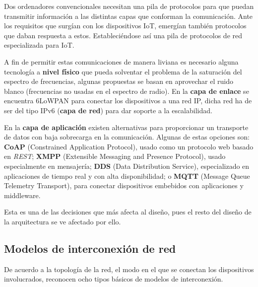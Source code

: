 \documentclass[a4paper,10pt]{article}
\begin{document}
Dos ordenadores convencionales necesitan una pila de protocolos para que
puedan transmitir información a las distintas capas que conforman la
comunicación. Ante los requisitos que surgían con los dispositivos IoT,
emergían también protocolos que daban respuesta a estos. Estableciéndose
así una pila de protocolos de red especializada para IoT.

A fin de permitir estas comunicaciones de manera liviana es necesario
alguna tecnología a \textbf{nivel físico} que pueda solventar el
problema de la saturación del espectro de frecuencias, algunas
propuestas se basan en aprovechar el ruido blanco (frecuencias no
usadas en el espectro de radio)\cite{tempertonTVWhiteSpace2015}.  En
la \textbf{capa de enlace} se encuentra 6LoWPAN
\cite{schumacherIPv6LowPowerWireless} para conectar los dispositivos a
una red IP, dicha red ha de ser del tipo IPv6 (\textbf{capa de red})
para dar soporte a la escalabilidad.

En la \textbf{capa de aplicación} existen alternativas para
proporcionar un transporte de datos con baja sobrecarga en la
comunicación. Algunas de estas opciones\cite{al-fuqahaInternetThingsSurvey2015}
son: \textbf{CoAP}
(Constrained Application Protocol), usado como un protocolo web basado
en \textit{REST}\cite{WebServicesArchitecture}; \textbf{XMPP}
(Extensible Messaging and Presence Protocol), usado especialmente en
mensajería; \textbf{DDS} (Data Distribution Service), especializado en
aplicaciones de tiempo real y con alta disponibilidad; o \textbf{MQTT}
(Message Queue Telemetry Transport), para conectar dispositivos
embebidos con aplicaciones y middleware.

Esta es una de las decisiones que más afecta al diseño, pues el resto
del diseño de la arquitectura se ve afectado por ello.

\subsection{Modelos de interconexión de
red}\label{modelos-de-interconexiuxf3n-de-red}

De acuerdo a la topología de la red, el modo en el que se conectan los
dispositivos involucrados, reconocen ocho tipos básicos de modelos de
interconexión\cite{bicsiNetworkDesignBasics2002}.
\end{document}
